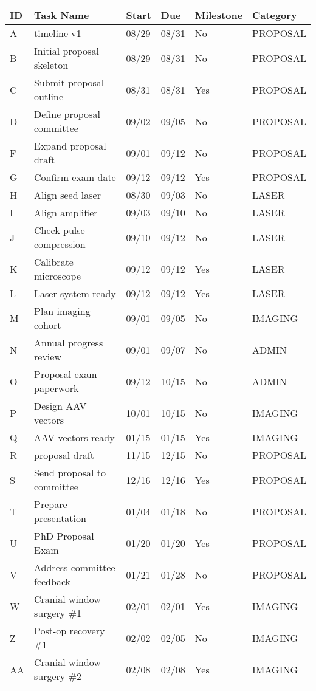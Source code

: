 \documentclass[portrait,a4paper]{article}
\begin{document}
\begin{longtable}{p{2cm}p{4cm}p{2cm}p{2cm}p{2cm}p{3cm}}
\toprule
\textbf{ID} & \textbf{Task Name} & \textbf{Start} & \textbf{Due} & \textbf{Milestone} & \textbf{Category} \\
\midrule
\endhead

A & timeline v1 & 08/29 & 08/31 & No & PROPOSAL \\
B & Initial proposal skeleton & 08/29 & 08/31 & No & PROPOSAL \\
C & Submit proposal outline & 08/31 & 08/31 & Yes & PROPOSAL \\
D & Define proposal committee & 09/02 & 09/05 & No & PROPOSAL \\
F & Expand proposal draft & 09/01 & 09/12 & No & PROPOSAL \\
G & Confirm exam date & 09/12 & 09/12 & Yes & PROPOSAL \\
H & Align seed laser & 08/30 & 09/03 & No & LASER \\
I & Align amplifier & 09/03 & 09/10 & No & LASER \\
J & Check pulse compression & 09/10 & 09/12 & No & LASER \\
K & Calibrate microscope & 09/12 & 09/12 & Yes & LASER \\
L & Laser system ready & 09/12 & 09/12 & Yes & LASER \\
M & Plan imaging cohort & 09/01 & 09/05 & No & IMAGING \\
N & Annual progress review & 09/01 & 09/07 & No & ADMIN \\
O & Proposal exam paperwork & 09/12 & 10/15 & No & ADMIN \\
P & Design AAV vectors & 10/01 & 10/15 & No & IMAGING \\
Q & AAV vectors ready & 01/15 & 01/15 & Yes & IMAGING \\
R & proposal draft & 11/15 & 12/15 & No & PROPOSAL \\
S & Send proposal to committee & 12/16 & 12/16 & Yes & PROPOSAL \\
T & Prepare presentation & 01/04 & 01/18 & No & PROPOSAL \\
U & PhD Proposal Exam & 01/20 & 01/20 & Yes & PROPOSAL \\
V & Address committee feedback & 01/21 & 01/28 & No & PROPOSAL \\
W & Cranial window surgery \#1 & 02/01 & 02/01 & Yes & IMAGING \\
Z & Post-op recovery \#1 & 02/02 & 02/05 & No & IMAGING \\
AA & Cranial window surgery \#2 & 02/08 & 02/08 & Yes & IMAGING \\

\end{longtable}
\end{document}
